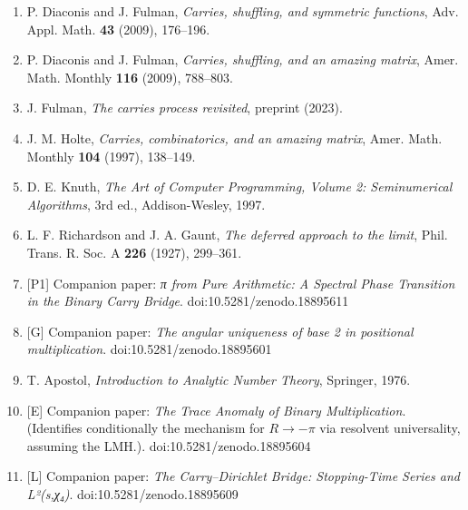 \documentclass[
  11pt,
]{article}
\providecommand{\tightlist}{%
  \setlength{\itemsep}{0pt}\setlength{\parskip}{0pt}}
\begin{document}
\begin{enumerate}
\def\labelenumi{\arabic{enumi}.}
\tightlist
\item
  P. Diaconis and J. Fulman, \emph{Carries, shuffling, and symmetric functions},
  Adv. Appl. Math. \textbf{43} (2009), 176--196.
\item
  P. Diaconis and J. Fulman, \emph{Carries, shuffling, and an amazing matrix},
  Amer. Math. Monthly \textbf{116} (2009), 788--803.
\item
  J. Fulman, \emph{The carries process revisited}, preprint (2023).
\item
  J. M. Holte, \emph{Carries, combinatorics, and an amazing matrix}, Amer. Math.
  Monthly \textbf{104} (1997), 138--149.
\item
  D. E. Knuth, \emph{The Art of Computer Programming, Volume 2: Seminumerical
  Algorithms}, 3rd ed., Addison-Wesley, 1997.
\item
  L. F. Richardson and J. A. Gaunt, \emph{The deferred approach to the limit},
  Phil. Trans. R. Soc. A \textbf{226} (1927), 299--361.
\item
  {[}P1{]} Companion paper: \emph{π from Pure Arithmetic: A Spectral Phase
  Transition in the Binary Carry Bridge}. doi:10.5281/zenodo.18895611
\item
  {[}G{]} Companion paper: \emph{The angular uniqueness of base 2 in positional
  multiplication}. doi:10.5281/zenodo.18895601
\item
  T. Apostol, \emph{Introduction to Analytic Number Theory}, Springer, 1976.
\item
  {[}E{]} Companion paper: \emph{The Trace Anomaly of Binary Multiplication}.
  (Identifies conditionally the mechanism for \(R \to -\pi\) via resolvent
  universality, assuming the LMH.). doi:10.5281/zenodo.18895604
\item
  {[}L{]} Companion paper: \emph{The Carry--Dirichlet Bridge: Stopping-Time
  Series and L²(s,χ₄)}. doi:10.5281/zenodo.18895609
\end{enumerate}
\end{document}
